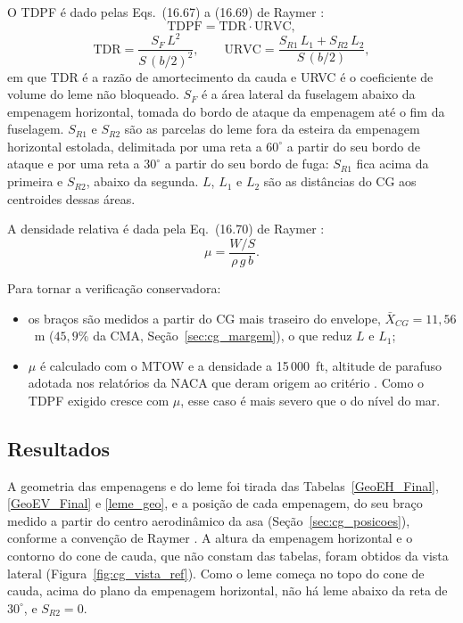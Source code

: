 O TDPF é dado pelas Eqs.~(16.67) a (16.69) de Raymer \cite{raymer2018}:
\begin{equation}
  \mathrm{TDPF} = \mathrm{TDR}\cdot\mathrm{URVC},
  \label{eq:parafuso_tdpf}
\end{equation}
\begin{equation}
  \mathrm{TDR} = \frac{S_F\,L^2}{S\,(b/2)^2}, \qquad
  \mathrm{URVC} = \frac{S_{R1}\,L_1 + S_{R2}\,L_2}{S\,(b/2)},
  \label{eq:parafuso_tdr_urvc}
\end{equation}
em que TDR é a razão de amortecimento da cauda e URVC é o coeficiente de volume do leme não bloqueado. $S_F$ é a área lateral da fuselagem abaixo da empenagem horizontal, tomada do bordo de ataque da empenagem até o fim da fuselagem. $S_{R1}$ e $S_{R2}$ são as parcelas do leme fora da esteira da empenagem horizontal estolada, delimitada por uma reta a $60^\circ$ a partir do seu bordo de ataque e por uma reta a $30^\circ$ a partir do seu bordo de fuga: $S_{R1}$ fica acima da primeira e $S_{R2}$, abaixo da segunda. $L$, $L_1$ e $L_2$ são as distâncias do CG aos centroides dessas áreas.

A densidade relativa é dada pela Eq.~(16.70) de Raymer \cite{raymer2018}:
\begin{equation}
  \mu = \frac{W/S}{\rho\,g\,b}.
  \label{eq:parafuso_mu}
\end{equation}

Para tornar a verificação conservadora:
\begin{itemize}
  \item os braços são medidos a partir do CG mais traseiro do envelope, $\bar{X}_{CG} = 11{,}56$~m ($45{,}9\%$ da CMA, Seção~\ref{sec:cg_margem}), o que reduz $L$ e $L_1$;
  \item $\mu$ é calculado com o MTOW e a densidade a 15\,000~ft, altitude de parafuso adotada nos relatórios da NACA que deram origem ao critério \cite{naca711}. Como o TDPF exigido cresce com $\mu$, esse caso é mais severo que o do nível do mar.
\end{itemize}

\subsection{Resultados}

A geometria das empenagens e do leme foi tirada das Tabelas~\ref{GeoEH_Final}, \ref{GeoEV_Final} e \ref{leme_geo}, e a posição de cada empenagem, do seu braço medido a partir do centro aerodinâmico da asa (Seção~\ref{sec:cg_posicoes}), conforme a convenção de Raymer \cite{raymer2018}. A altura da empenagem horizontal e o contorno do cone de cauda, que não constam das tabelas, foram obtidos da vista lateral (Figura~\ref{fig:cg_vista_ref}). Como o leme começa no topo do cone de cauda, acima do plano da empenagem horizontal, não há leme abaixo da reta de $30^\circ$, e $S_{R2} = 0$.


